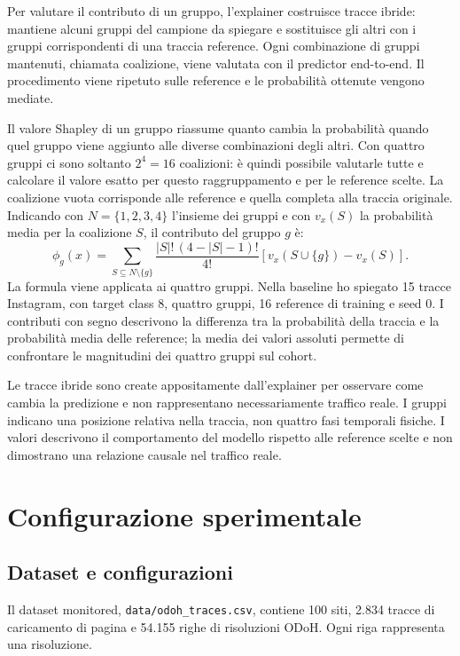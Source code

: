 \documentclass[11pt,a4paper]{article}
\begin{document}
Per valutare il contributo di un gruppo, l'explainer costruisce tracce ibride: mantiene alcuni gruppi del campione da spiegare e sostituisce gli altri con i gruppi corrispondenti di una traccia reference. Ogni combinazione di gruppi mantenuti, chiamata coalizione, viene valutata con il predictor end-to-end. Il procedimento viene ripetuto sulle reference e le probabilità ottenute vengono mediate.

Il valore Shapley di un gruppo riassume quanto cambia la probabilità quando quel gruppo viene aggiunto alle diverse combinazioni degli altri. Con quattro gruppi ci sono soltanto $2^4=16$ coalizioni: è quindi possibile valutarle tutte e calcolare il valore esatto per questo raggruppamento e per le reference scelte. La coalizione vuota corrisponde alle reference e quella completa alla traccia originale. Indicando con $N=\{1,2,3,4\}$ l'insieme dei gruppi e con $v_x(S)$ la probabilità media per la coalizione $S$, il contributo del gruppo $g$ è:
\begin{equation}
\phi_g(x)=\sum_{S\subseteq N\setminus\{g\}}
\frac{|S|!\,(4-|S|-1)!}{4!}
\left[v_x(S\cup\{g\})-v_x(S)\right].
\label{eq:shapley}
\end{equation}
La formula viene applicata ai quattro gruppi. Nella baseline ho spiegato 15 tracce Instagram, con target class 8, quattro gruppi, 16 reference di training e seed 0. I contributi con segno descrivono la differenza tra la probabilità della traccia e la probabilità media delle reference; la media dei valori assoluti permette di confrontare le magnitudini dei quattro gruppi sul cohort.

Le tracce ibride sono create appositamente dall'explainer per osservare come cambia la predizione e non rappresentano necessariamente traffico reale. I gruppi indicano una posizione relativa nella traccia, non quattro fasi temporali fisiche. I valori descrivono il comportamento del modello rispetto alle reference scelte e non dimostrano una relazione causale nel traffico reale.

\section{Configurazione sperimentale}
\subsection{Dataset e configurazioni}
Il dataset monitored, \texttt{data/odoh\_traces.csv}, contiene 100 siti, 2.834 tracce di caricamento di pagina e 54.155 righe di risoluzioni ODoH. Ogni riga rappresenta una risoluzione. 
\end{document}
